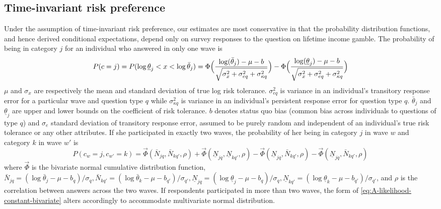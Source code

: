 \documentclass[emulatestandardclasses, 10pt, abstract = true]{scrartcl}
\begin{document}
\subsection{Time-invariant risk preference}
Under the assumption of time-invariant risk preference, our estimates are most conservative in that the probability distribution functions, and hence derived conditional expectations, depend only on survey responses to the question on lifetime income gamble. The probability of being in category $j$ for an individual who answered in only one wave is 
\begin{equation}
P(c=j)=P(\log\underline{\theta}_j<x<\log\bar{\theta}_j)=\Phi\Big({\log(\bar{\theta}_j)-\mu-b\over\sqrt{\sigma_x^2+\sigma_{eq}^2+\sigma_{\kappa q}^2}}\Big)-\Phi\Big({\log(\underline{\theta}_j)-\mu-b\over\sqrt{\sigma_x^2+\sigma_{eq}^2+\sigma_{\kappa q}^2}}\Big) 
\label{eq:A-likelihood-constant-univariate}	
\end{equation}
$\mu$ and $\sigma_x$ are respectively the mean and standard deviation of true log risk tolerance. $\sigma_{eq}^2$ is variance in an individual's transitory response error for a particular wave and question type $q$ while $\sigma_{\kappa q}^2$ is variance in an individual's persistent response error for question type $q$. $\bar \theta_j$ and $\underline{\theta}_j$ are upper and lower bounds on the coefficient of risk tolerance. $b$ denotes status quo bias (common bias across individuals to questions of type $q$) and $\sigma_e$ standard deviation of transitory response error, assumed to be purely random and independent of an individual's true risk tolerance or any other attributes. If she participated in exactly two waves, the probability of her being in category $j$ in wave $w$ and category $k$ in wave $w'$ is
\begin{equation}
P(c_w=j, c_{w'}=k)=\vec{\Phi}(\bar N_{jq}, \bar N_{kq'},\rho)+\vec{\Phi}(\underline N_{jq}, \underline N_{kq'},\rho)-\vec{\Phi}(\underline N_{jq}, \bar N_{kq'},\rho)-\vec{\Phi}(\underline N_{jq}, \bar N_{kq'},\rho)
\label{eq:A-likelihood-constant-bivariate}
\end{equation}
where $\vec{\Phi}$ is the bivariate normal cumulative distribution function, $\bar N_{jq}=(\log \bar \theta_j-\mu-b_q)/\sigma_q,\bar N_{kq'}=(\log \bar \theta_k-\mu-b_{q'})/\sigma_{q'}, \underline N_{jq}=(\log \underline \theta_j-\mu-b_q)/\sigma_q, \underline N_{kq'}=(\log \underline \theta_k-\mu-b_{q'})/\sigma_{q'}$, and $\rho$ is the correlation between answers across the two waves. If respondents participated in more than two waves, the form of \eqref{eq:A-likelihood-constant-bivariate} alters accordingly to accommodate multivariate normal distribution.
\end{document}
